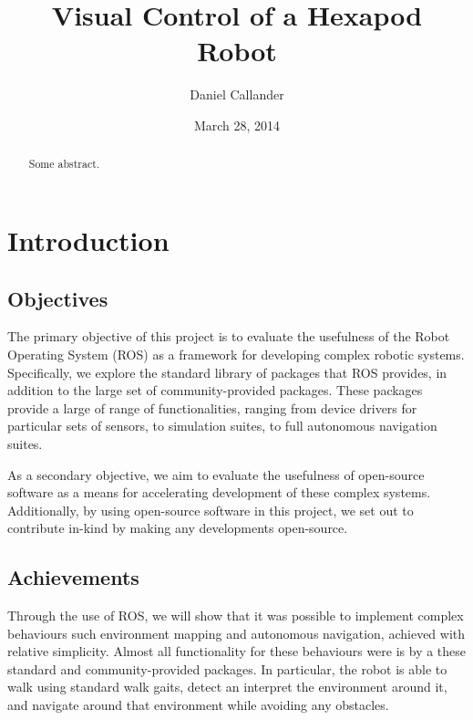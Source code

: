 \documentclass{l4proj}
\begin{document}


\title{Visual Control of a Hexapod Robot}
\author{Daniel Callander}
\date{March 28, 2014}
\maketitle

\begin{abstract}
Some abstract.
\end{abstract}

\educationalconsent
\tableofcontents


\chapter{Introduction}

\section{Objectives}
The primary objective of this project is to evaluate the usefulness of the Robot Operating System (ROS) \cite{ros_site} as a framework for developing complex robotic systems. Specifically, we explore the standard library of packages that ROS provides, in addition to the large set of community-provided packages. These packages provide a large of range of functionalities, ranging from device drivers for particular sets of sensors, to simulation suites, to full autonomous navigation suites.

As a secondary objective, we aim to evaluate the usefulness of open-source software as a means for accelerating development of these complex systems. Additionally, by using open-source software in this project, we set out to contribute in-kind by making any developments open-source.

\section{Achievements}
Through the use of ROS, we will show that it was possible to implement complex behaviours such environment mapping and autonomous navigation, achieved with relative simplicity. Almost all functionality for these behaviours were is by a these standard and community-provided packages. In particular, the robot is able to walk using standard walk gaits, detect an interpret the environment around it, and navigate around that environment while avoiding any obstacles.
\end{document}
